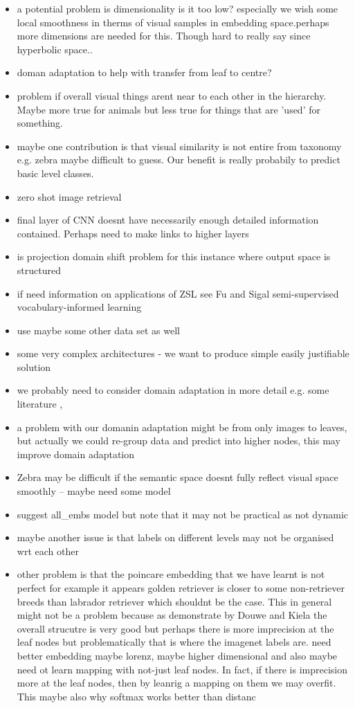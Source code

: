 \documentclass[12pt]{report}
\begin{document}
\begin{itemize}
    \item a potential problem is dimensionality is it too low? especially we wish some local smoothness in therms of visual samples in embedding space.perhaps more dimensions are needed for this. Though hard to really say since hyperbolic space..
    \item doman adaptation to help with transfer  from leaf to centre?
    \item problem if overall visual things arent near to each other in the hierarchy. Maybe more true for animals but less true for things that are 'used' for something.
    \item maybe one contribution is that visual similarity is not entire from taxonomy e.g. zebra maybe difficult to guess. Our benefit is really probabily to predict basic level classes. 
    \item zero shot image retrieval
    \item final layer of CNN doesnt have necessarily enough detailed information contained. Perhaps need to make links to higher layers \cite{Ba2015}
    \item is projection domain shift problem for this instance where output space is structured
    \item if need information on applications of ZSL see Fu and Sigal semi-supervised vocabulary-informed learning
    \item use maybe some other data set as well
    \item some very complex architectures - we want to produce simple easily justifiable solution
    \item we probably need to consider domain adaptation in more detail e.g. some literature \cite{Patel2015}, \cite{Wang2018}
    \item a problem with our domanin adaptation might be from only images to leaves, but actually we could re-group data and predict into higher nodes, this may improve domain adaptation
    \item Zebra may be difficult if the semantic space doesnt fully reflect visual space smoothly -- maybe need some model 
    \item suggest all\_embs model but note that it may not be practical as not dynamic
    \item maybe another issue is that labels on different levels may not be organised wrt each other
    \item other problem is that the poincare embedding that we have learnt is not perfect for example it appears golden retriever is closer to some non-retriever breeds than labrador retriever which shouldnt be the case. This in general might not be a problem because as demonstrate by Douwe and Kiela the overall strucutre is very good but perhaps there is more imprecision at the leaf nodes but problematically that is where the imagenet labels are. need better embedding maybe lorenz, maybe higher dimensional and also maybe need ot learn mapping with not-just leaf nodes. In fact, if there is imprecision more at the leaf nodes, then by leanrig a mapping on them we may overfit. This maybe also why softmax works better than distanc

\end{itemize}
\end{document}
